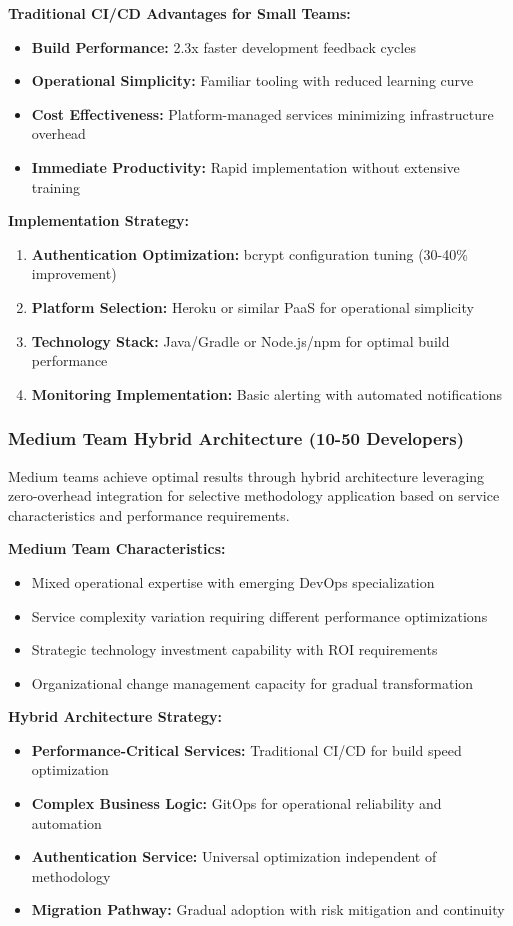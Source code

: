 \textbf{Traditional CI/CD Advantages for Small Teams:}
\begin{itemize}
\item \textbf{Build Performance:} 2.3x faster development feedback cycles
\item \textbf{Operational Simplicity:} Familiar tooling with reduced learning curve
\item \textbf{Cost Effectiveness:} Platform-managed services minimizing infrastructure overhead
\item \textbf{Immediate Productivity:} Rapid implementation without extensive training
\end{itemize}

\textbf{Implementation Strategy:}
\begin{enumerate}
\item \textbf{Authentication Optimization:} bcrypt configuration tuning (30-40\% improvement)
\item \textbf{Platform Selection:} Heroku or similar PaaS for operational simplicity
\item \textbf{Technology Stack:} Java/Gradle or Node.js/npm for optimal build performance
\item \textbf{Monitoring Implementation:} Basic alerting with automated notifications
\end{enumerate}

\subsubsection{Medium Team Hybrid Architecture (10-50 Developers)}

Medium teams achieve optimal results through hybrid architecture leveraging zero-overhead integration for selective methodology application based on service characteristics and performance requirements.

\textbf{Medium Team Characteristics:}
\begin{itemize}
\item Mixed operational expertise with emerging DevOps specialization
\item Service complexity variation requiring different performance optimizations
\item Strategic technology investment capability with ROI requirements
\item Organizational change management capacity for gradual transformation
\end{itemize}

\textbf{Hybrid Architecture Strategy:}
\begin{itemize}
\item \textbf{Performance-Critical Services:} Traditional CI/CD for build speed optimization
\item \textbf{Complex Business Logic:} GitOps for operational reliability and automation
\item \textbf{Authentication Service:} Universal optimization independent of methodology
\item \textbf{Migration Pathway:} Gradual adoption with risk mitigation and continuity
\end{itemize}

